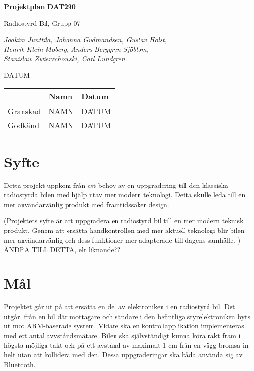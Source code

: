 \documentclass[a4paper]{article}
\begin{document}
\begin{titlepage}
\centering
{\bfseries\huge Projektplan DAT290}

\vspace{10mm}

{\Large Radiostyrd Bil, Grupp 07}

\vspace{20mm}

{\Large \itshape{Joakim Junttila, Johanna Gudmandsen, Gustav Holst,\\Henrik Klein Moberg, Anders Berggren Sjöblom, \\[1mm] Stanislaw Zwierzchowski, Carl Lundgren}}

\vspace{10mm}

{DATUM}


\normalsize{
\begin{table}[b]
\centering
\begin{tabular}{|l|l|l|}  \hline
          & \bf Namn & \bf Datum   \\ \hline \hline
 Granskad & NAMN     & DATUM        \\ \hline
 Godkänd  & NAMN     & DATUM         \\ \hline
  \end{tabular}  
  \end{table}}

\end{titlepage}
\newpage
\tableofcontents
\newpage


\section{Syfte}
Detta projekt uppkom från ett behov av en uppgradering till den klassiska radiostyrda bilen med hjälp utav mer modern teknologi. Detta skulle leda till en mer användarvänlig produkt med framtidssäker design.

\vspace{5mm}
(Projektets syfte är att uppgradera en radiostyrd bil till en mer modern teknisk produkt. Genom att ersätta handkontrollen med mer aktuell teknologi blir bilen mer användarvänlig och dess funktioner mer adapterade till dagens samhälle. ) ÄNDRA TILL DETTA, elr liknande??

\section{Mål}
Projektet går ut på att ersätta en del av elektroniken i en radiostyrd bil. Det utgår ifrån en bil där mottagare och sändare i den befintliga styrelektroniken byts ut mot ARM-baserade system. Vidare ska en kontrollapplikation implementeras med ett antal avvståndsmätare. Bilen ska självständigt kunna köra rakt fram i högsta möjliga takt och på ett avstånd av maximalt 1 cm från en vägg bromsa in helt utan att kollidera med den. Dessa uppgraderingar ska båda använda sig av Bluetooth. 
\end{document}
